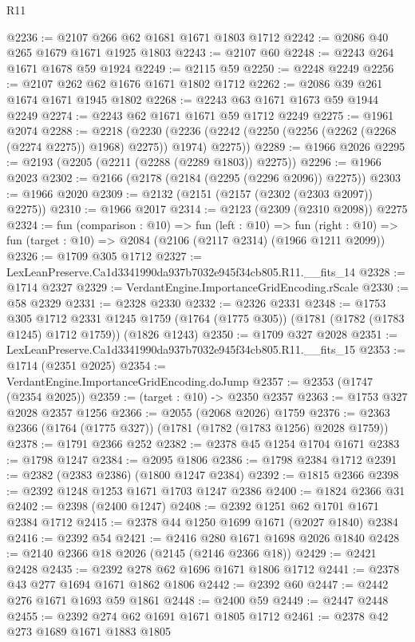 \begin{lexlean}{R11}
\begin{coremodule}
@2236 := @2107 @266 @62 @1681 @1671 @1803 @1712
@2242 := @2086 @40 @265 @1679 @1671 @1925 @1803
@2243 := @2107 @60
@2248 := @2243 @264 @1671 @1678 @59 @1924
@2249 := @2115 @59
@2250 := @2248 @2249
@2256 := @2107 @262 @62 @1676 @1671 @1802 @1712
@2262 := @2086 @39 @261 @1674 @1671 @1945 @1802
@2268 := @2243 @63 @1671 @1673 @59 @1944 @2249
@2274 := @2243 @62 @1671 @1671 @59 @1712 @2249
@2275 := @1961 @2074
@2288 := @2218
    (@2230 (@2236 (@2242 (@2250 (@2256 (@2262 (@2268 (@2274 @2275)) @1968) @2275)) @1974) @2275))
@2289 := @1966 @2026
@2295 := @2193 (@2205 (@2211 (@2288 (@2289 @1803)) @2275))
@2296 := @1966 @2023
@2302 := @2166 (@2178 (@2184 (@2295 (@2296 @2096)) @2275))
@2303 := @1966 @2020
@2309 := @2132 (@2151 (@2157 (@2302 (@2303 @2097)) @2275))
@2310 := @1966 @2017
@2314 := @2123 (@2309 (@2310 @2098)) @2275
@2324 := fun (comparison : @10) =>
  fun (left : @10) =>
  fun (right : @10) => fun (target : @10) => @2084 (@2106 (@2117 @2314) (@1966 @1211 @2099))
@2326 := @1709 @305 @1712
@2327 := LexLeanPreserve.Ca1d3341990da937b7032e945f34cb805.R11.__fits_14
@2328 := @1714 @2327
@2329 := VerdantEngine.ImportanceGridEncoding.rScale
@2330 := @58 @2329
@2331 := @2328 @2330
@2332 := @2326 @2331
@2348 := @1753
    @305
    @1712
    @2331
    @1245
    @1759
    (@1764 (@1775 @305))
    (@1781 (@1782 (@1783 @1245) @1712 @1759))
    (@1826 @1243)
@2350 := @1709 @327 @2028
@2351 := LexLeanPreserve.Ca1d3341990da937b7032e945f34cb805.R11.__fits_15
@2353 := @1714 (@2351 @2025)
@2354 := VerdantEngine.ImportanceGridEncoding.doJump
@2357 := @2353 (@1747 (@2354 @2025))
@2359 := (target : @10) -> @2350 @2357
@2363 := @1753 @327 @2028 @2357 @1256
@2366 := @2055 (@2068 @2026) @1759
@2376 := @2363 @2366 (@1764 (@1775 @327)) (@1781 (@1782 (@1783 @1256) @2028 @1759))
@2378 := @1791 @2366 @252
@2382 := @2378 @45 @1254 @1704 @1671
@2383 := @1798 @1247
@2384 := @2095 @1806
@2386 := @1798 @2384 @1712
@2391 := @2382 (@2383 @2386) (@1800 @1247 @2384)
@2392 := @1815 @2366
@2398 := @2392 @1248 @1253 @1671 @1703 @1247 @2386
@2400 := @1824 @2366 @31
@2402 := @2398 (@2400 @1247)
@2408 := @2392 @1251 @62 @1701 @1671 @2384 @1712
@2415 := @2378 @44 @1250 @1699 @1671 (@2027 @1840) @2384
@2416 := @2392 @54
@2421 := @2416 @280 @1671 @1698 @2026 @1840
@2428 := @2140 @2366 @18 @2026 (@2145 (@2146 @2366 @18))
@2429 := @2421 @2428
@2435 := @2392 @278 @62 @1696 @1671 @1806 @1712
@2441 := @2378 @43 @277 @1694 @1671 @1862 @1806
@2442 := @2392 @60
@2447 := @2442 @276 @1671 @1693 @59 @1861
@2448 := @2400 @59
@2449 := @2447 @2448
@2455 := @2392 @274 @62 @1691 @1671 @1805 @1712
@2461 := @2378 @42 @273 @1689 @1671 @1883 @1805

\end{coremodule}
\end{lexlean}
